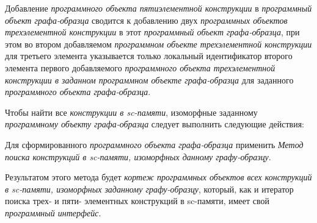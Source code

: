 \begin{SCn}
\begin{scnsubstruct}
\begin{scnsubstruct}
\begin{scnsubstruct}
\begin{scnsubstruct}
\begin{scnsubstruct}
\begin{scnsubstruct}
\begin{scnsubstruct}
\begin{scnsubstruct}
{			Добавление \textit{программного объекта пятиэлементной конструкции} в \textit{программный объект графа-образца} сводится к добавлению двух \textit{программных объектов трехэлементной конструкции} в этот \textit{программный объект графа-образца}, при этом во втором добавляемом \textit{программном объекте трехэлементной конструкции} для третьего элемента указывается только локальный идентификатор второго элемента первого добавляемого \textit{программного объекта трехэлементной конструкции в заданном программном объекте графа-образца} для заданного \textit{программного объекта графа-образца}.
			
			Чтобы найти все \textit{конструкции в sc-памяти}, изоморфные заданному \textit{программному объекту графа-образца} следует выполнить следующие действия:
			\begin{scnitemize}
				\item Для сформированного \textit{программного объекта графа-образца} применить \textit{Метод поиска конструкций в sc-памяти, изоморфных данному графу-образцу}.
				\item Результатом этого метода будет \textit{кортеж программных объектов всех конструкций в sc-памяти, изоморфных заданному графу-образцу}, который, как и итератор поиска трех- и пяти- элементных конструкций в sc-памяти, имеет свой \textit{программный интерфейс}.
			\end{scnitemize}
		}	
		\end{scnsubstruct}
	\end{scnsubstruct}
	
	\begin{scnsubstruct}
		
		\begin{scnsubstruct}
			
			\begin{scnindent}
			\end{scnindent}
			
			\begin{scnsubstruct}
				

\end{scnsubstruct}
\end{scnsubstruct}
\end{scnsubstruct}
\end{scnsubstruct}
\end{scnsubstruct}
\end{scnsubstruct}
\end{scnsubstruct}
\end{scnsubstruct}
\end{scnsubstruct}
\end{SCn}
